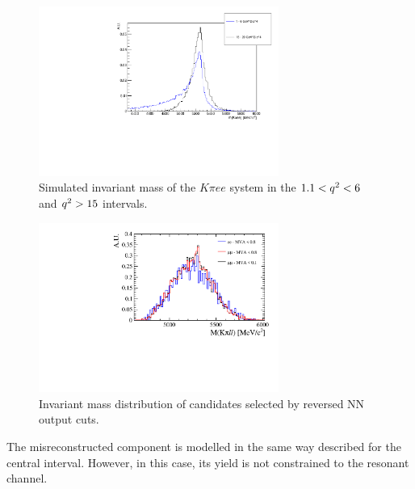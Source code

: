  \begin{figure}[h!]
\centering
\includegraphics[width=0.70\textwidth]{RKst/figs/high_central_mass_comparison.pdf}
\caption{Simulated invariant mass of the $K\pi ee$ system in the $1.1 < {q^2} < 6$ and ${q^2} > 15$ \gevgevcccc intervals.  }
\label{fig:high_central_mass_comparison}
\end{figure}

 \begin{figure}[hb!]
\centering
\includegraphics[width=0.70\textwidth]{RKst/figs/highq2_comb.pdf}
\caption{Invariant mass distribution of candidates selected by reversed NN output cuts.}
\label{fig:highq2_comb}
\end{figure}

The misreconstructed component is modelled in the same way described for the central \qsq interval.
However, in this case, its yield is not constrained to the resonant channel.

